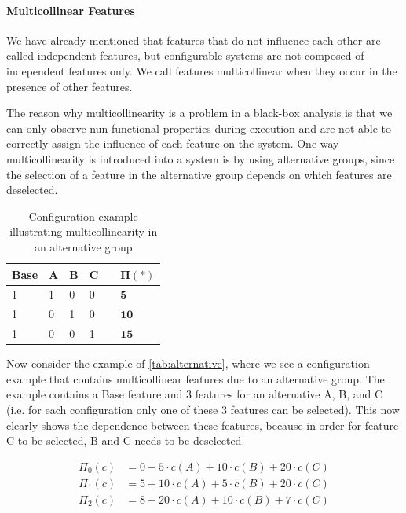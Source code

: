 \paragraph{Multicollinear Features}\label{ColinearF}
We have already mentioned that features that do not influence each other are called independent features, but configurable systems are not composed
of independent features only. We call features multicollinear when they occur in the presence of other features.

The reason why multicollinearity is a problem in a black-box analysis is
that we can only observe nun-functional properties during execution and are not able to correctly assign the influence of each feature
on the system. One way multicollinearity is introduced into a system is by using alternative groups, since the selection of a feature in the
alternative group depends on which features are deselected. \cite{Multicollinearity}

\begin{table}[h]
    \centering
    \begin{tabular}{llllll}
    \hline
    Base & A & B & C &  & $\bm{\Pi(*)}$ \\ \hline
    1 & 1 & 0 & 0 &  & $\mathbf{5}$  \\
    1 & 0 & 1 & 0 &  & $\mathbf{10}$  \\  
    1 & 0 & 0 & 1 &  & $\mathbf{15}$  \\\hline
    \end{tabular}  
    \caption{Configuration example illustrating multicollinearity in an alternative group}\label{tab:alternative}
\end{table}


Now consider the example of \autoref{tab:alternative}, where we see a configuration example that contains multicollinear features due to an alternative group.
The example contains a Base feature and 3 features for an alternative A, B, and C (i.e. for each configuration only one of these 3 features can be selected).
This now clearly shows the dependence between these features, because in order for feature C to be selected, B and C needs to be deselected.

\begin{align*}
    \Pi_0(c) &= 0 + 5 \cdot c(A) + 10\cdot c(B) + 20\cdot c(C) \\
    \Pi_1(c) &= 5 + 10 \cdot c(A) + 5\cdot c(B) + 20\cdot c(C) \\
    \Pi_2(c) &= 8 + 20 \cdot c(A) + 10\cdot c(B) + 7\cdot c(C) \\
\end{align*}

